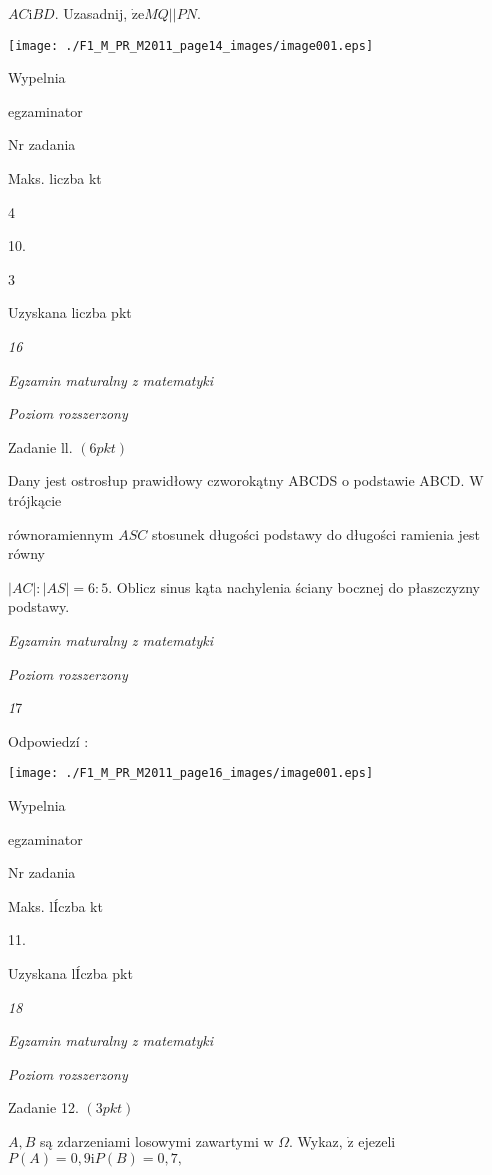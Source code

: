 \documentclass[a4paper,12pt]{article}
\begin{document}
$AC\mathrm{i}BD$. Uzasadnij, $\dot{\mathrm{z}}\mathrm{e}MQ||PN.$
\begin{center}
\texttt{[image: ./F1\_M\_PR\_M2011\_page14\_images/image001.eps]}
\end{center}
Wypelnia

egzaminator

Nr zadania

Maks. liczba kt

4

10.

3

Uzyskana liczba pkt





{\it 16}

{\it Egzamin maturalny z matematyki}

{\it Poziom rozszerzony}

Zadanie ll. $(6pkt)$

Dany jest ostrosłup prawidłowy czworokątny ABCDS o podstawie ABCD. $\mathrm{W}$ trójkącie

równoramiennym $ASC$ stosunek długości podstawy do długości ramienia jest równy

$|AC|:|AS|=6:5$. Oblicz sinus kąta nachylenia ściany bocznej do płaszczyzny podstawy.





{\it Egzamin maturalny z matematyki}

{\it Poziom rozszerzony}

{\it 1}7

Odpowiedzí :
\begin{center}
\texttt{[image: ./F1\_M\_PR\_M2011\_page16\_images/image001.eps]}
\end{center}
Wypelnia

egzaminator

Nr zadania

Maks. lÍczba kt

11.

Uzyskana lÍczba pkt





{\it 18}

{\it Egzamin maturalny z matematyki}

{\it Poziom rozszerzony}

Zadanie 12. $(3pkt)$

$A, B$ są zdarzeniami losowymi zawartymi w $\Omega$. Wykaz, $\dot{\mathrm{z}}$ ejezeli $P(A)=0,9 \mathrm{i}P(B)=0,7,$
\end{document}
